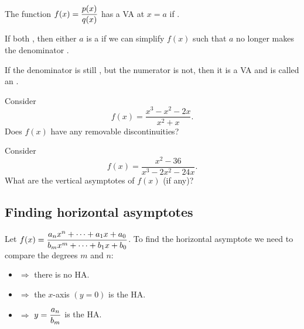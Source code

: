 \begin{fact}
The function $\displaystyle f(x)=\frac{p(x)}{q(x)}$ has a VA at $x=a$
if .

\vspace{1em}

If both , then
either $a$ is a  if we can simplify $f(x)$ such
that $a$ no longer makes the denominator .

\vspace{1em}

If the denominator is still , but the numerator is not, then it is a VA and is called an .
\end{fact}

\ifprintanswers\else\newpage\fi

\begin{exercise}
Consider
\[
f(x)=\frac{x^3-x^2-2x}{x^2+x}.
\]
Does $f(x)$ have any removable discontinuities?
\end{exercise}
\begin{solution}[3.5in]

\end{solution}

\begin{exercise}
Consider
\[
f(x)=\frac{x^2-36}{x^3-2x^2-24x}.
\]
What are the vertical asymptotes of $f(x)$ (if any)?
\end{exercise}
\begin{solution}[3.5in]

\end{solution}

\subsection{Finding horizontal asymptotes}

\begin{fact}
Let $\displaystyle f(x)=\frac{a_nx^n+\cdots+a_1x+a_0}{b_mx^m+\cdots+b_1x+b_0}$.
To find the horizontal asymptote we need to compare the degrees $m$ and $n$:
\begin{itemize}
\item {} $\Rightarrow$ there is no HA.
\item {} $\Rightarrow$ the $x$-axis $(y=0)$
is the HA.
\item {} $\Rightarrow$ $\displaystyle y=\frac{a_n}{b_m}$
is the HA.
\end{itemize}
\end{fact}


